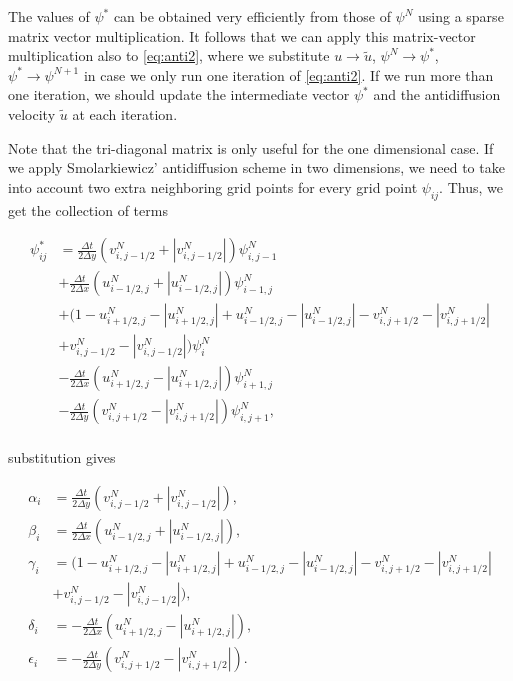 \documentclass[10pt, a4paper]{article}
\newcommand{\abs}[1]{\left\lvert#1\right\rvert}
\begin{document}
The values of $\psi^*$ can be obtained very efficiently from those of $\psi^N$ using a sparse matrix vector multiplication. It follows that we can apply this matrix-vector multiplication also to \ref{eq:anti2}, where we substitute $u \rightarrow \tilde{u}$, $\psi^N \rightarrow \psi^*$, $\psi^* \rightarrow \psi^{N+1}$ in case we only run one iteration of \ref{eq:anti2}. If we run more than one iteration, we should update the intermediate vector $\psi^*$ and the antidiffusion velocity $\tilde{u}$ at each iteration.

Note that the tri-diagonal matrix is only useful for the one dimensional case. If we apply Smolarkiewicz' antidiffusion scheme in two dimensions, we need to take into account two extra neighboring grid points for every grid point $\psi_{ij}$. Thus, we get the collection of terms 

\begin{align*}
\psi_{ij}^* &=
\frac{\Delta t}{2 \Delta y} \left( v_{i,j-1/2}^N + \abs{v_{i,j-1/2}^N} \right) \psi_{i,j-1}^N\\
&+\frac{\Delta t}{2 \Delta x} \left( u_{i-1/2,j}^N + \abs{u_{i-1/2,j}^N} \right) \psi_{i-1,j}^N\\
&+ \Big(1 - u_{i+1/2,j}^N - \abs{u_{i+1/2,j}^N} + u_{i-1/2,j}^N - \abs{u_{i-1/2,j}^N} - v_{i,j+1/2}^N - \abs{v_{i,j+1/2}^N} \\
&+ v_{i,j-1/2}^N - \abs{v_{i,j-1/2}^N} \Big) \psi_i^N\\
&-\frac{\Delta t}{2 \Delta x} \left( u_{i+1/2,j}^N - \abs{u_{i+1/2,j}^N} \right) \psi_{i+1,j}^N\\
&-\frac{\Delta t}{2 \Delta y} \left( v_{i,j+1/2}^N - \abs{v_{i,j+1/2}^N} \right) \psi_{i,j+1}^N,\\
\end{align*}

substitution gives

\begin{align*}
\alpha_i &= \frac{\Delta t}{2 \Delta y} \left( v_{i,j-1/2}^N + \abs{v_{i,j-1/2}^N} \right),\\
\beta_i &= \frac{\Delta t}{2 \Delta x} \left( u_{i-1/2,j}^N + \abs{u_{i-1/2,j}^N} \right),\\
\gamma_i &= \Big(1 - u_{i+1/2,j}^N - \abs{u_{i+1/2,j}^N} + u_{i-1/2,j}^N - \abs{u_{i-1/2,j}^N} - v_{i,j+1/2}^N - \abs{v_{i,j+1/2}^N} \\
&+ v_{i,j-1/2}^N - \abs{v_{i,j-1/2}^N} \Big),\\
\delta_i &= -\frac{\Delta t}{2 \Delta x} \left( u_{i+1/2,j}^N - \abs{u_{i+1/2,j}^N} \right),\\
\epsilon_i &= -\frac{\Delta t}{2 \Delta y} \left( v_{i,j+1/2}^N - \abs{v_{i,j+1/2}^N} \right).
\end{align*}
\end{document}
